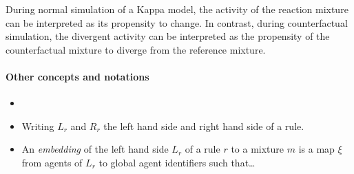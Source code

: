 During normal simulation of a Kappa model, the activity of the
reaction mixture can be interpreted as its propensity to change. In
contrast, during counterfactual simulation, the divergent activity can
be interpreted as the propensity of the counterfactual mixture to
diverge from the reference mixture.

\paragraph{Other concepts and notations}



\begin{itemize}
\item 

\item Writing $L_r$ and $R_r$ the left hand side and right hand side of a rule.

\item An \emph{embedding} of the left hand side $L_r$ of a rule $r$ to
  a mixture $m$ is a map $\xi$ from agents of $L_r$ to global agent
  identifiers such that\dots
\end{itemize}